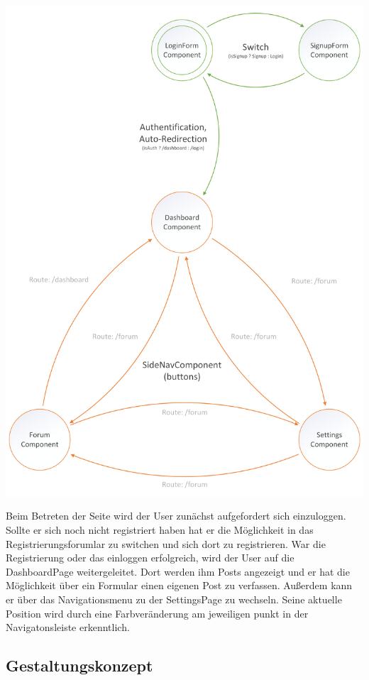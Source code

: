 \documentclass[12pt,titlepage]{article}
\begin{document}
\includegraphics [width=400pt]{Konzepte/bibnow_Navigationskonzept}



\vspace{2cm}


Beim Betreten der Seite wird der User zunächst aufgefordert sich einzuloggen. Sollte er sich noch nicht registriert haben hat er die Möglichkeit in das Registrierungsforumlar zu switchen und sich dort zu registrieren. War die Registrierung oder das einloggen erfolgreich, wird der User auf die DashboardPage weitergeleitet. Dort werden ihm Posts angezeigt und er hat die Möglichkeit über ein Formular einen eigenen Post zu verfassen. Außerdem kann er über das Navigationsmenu zu der SettingsPage zu wechseln. Seine aktuelle Position wird durch eine Farbveränderung am jeweiligen punkt in der Navigatonsleiste erkenntlich.

\newpage
\subsection{Gestaltungskonzept}
\end{document}

